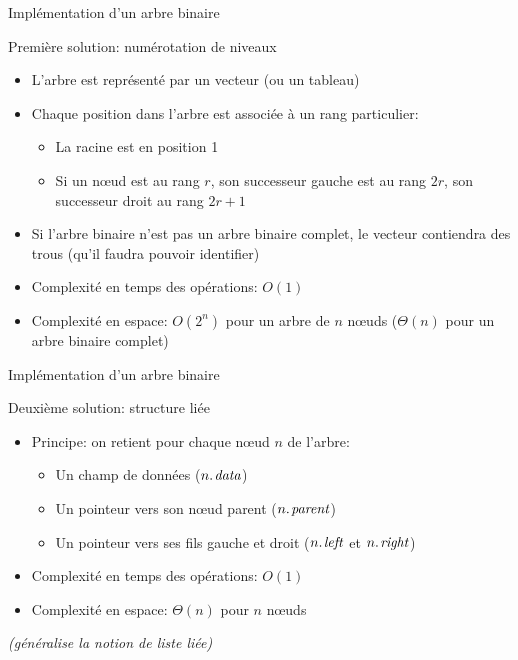 \begin{frame}{Implémentation d'un arbre binaire}

Première solution: \alert{numérotation de niveaux}
\begin{itemize}
\item L'arbre est représenté par un vecteur (ou un tableau)
\item Chaque position dans l'arbre est associée à un rang particulier:
\begin{itemize}
\item La racine est en position 1
\item Si un n\oe ud est au rang $r$, son successeur gauche est au rang $2r$, son successeur droit au rang $2r+1$
\end{itemize}
\item Si l'arbre binaire n'est pas un arbre binaire complet, le vecteur contiendra des trous (qu'il faudra pouvoir identifier)
\item Complexité en temps des opérations: $O(1)$
\item Complexité en espace: $O(2^n)$ pour un arbre de $n$ n\oe uds ($\Theta(n)$ pour un arbre binaire complet)
\end{itemize}


\end{frame}

\begin{frame}{Implémentation d'un arbre binaire}

Deuxième solution: \alert{structure liée}
\begin{itemize}
\item Principe: on retient pour chaque n\oe ud $n$ de l'arbre:
\begin{itemize}
\item Un champ de données ($\attrib{n}{data}$)
\item Un pointeur vers son n\oe ud parent ($\attrib{n}{parent}$)
\item Un pointeur vers ses fils gauche et droit ($\attrib{n}{left}$ et $\attrib{n}{right}$)
\end{itemize}
\item Complexité en temps des opérations: $O(1)$
\item Complexité en espace: $\Theta(n)$ pour $n$ n\oe uds
\end{itemize}

\bigskip

{\it (généralise la notion de liste liée)}

\end{frame}

